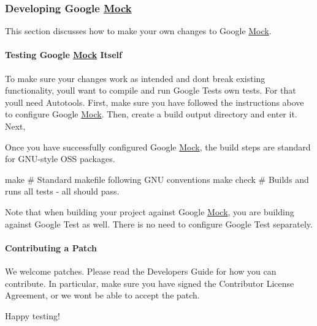\subsubsection*{Developing Google \hyperlink{class_mock}{Mock}}

This section discusses how to make your own changes to Google \hyperlink{class_mock}{Mock}.

\paragraph*{Testing Google \hyperlink{class_mock}{Mock} Itself}

To make sure your changes work as intended and don\textquotesingle{}t break existing functionality, you\textquotesingle{}ll want to compile and run Google Test\textquotesingle{}s own tests. For that you\textquotesingle{}ll need Autotools. First, make sure you have followed the instructions above to configure Google \hyperlink{class_mock}{Mock}. Then, create a build output directory and enter it. Next, 


Once you have successfully configured Google \hyperlink{class_mock}{Mock}, the build steps are standard for G\+N\+U-\/style O\+SS packages. \begin{DoxyVerb}make        # Standard makefile following GNU conventions
make check  # Builds and runs all tests - all should pass.
\end{DoxyVerb}


Note that when building your project against Google \hyperlink{class_mock}{Mock}, you are building against Google Test as well. There is no need to configure Google Test separately.

\paragraph*{Contributing a Patch}

We welcome patches. Please read the Developer\textquotesingle{}s Guide for how you can contribute. In particular, make sure you have signed the Contributor License Agreement, or we won\textquotesingle{}t be able to accept the patch.

Happy testing! 